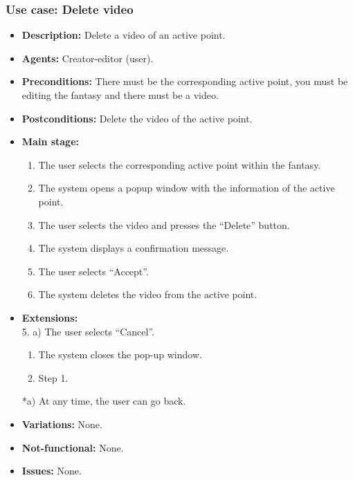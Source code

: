 \subsubsection{Use case: Delete video}
\begin{itemize}
	\item \textbf{Description:} Delete a video of an active point.
	\item \textbf{Agents:} Creator-editor (user).
	\item \textbf{Preconditions:} There must be the corresponding active point, you must be editing the fantasy and there must be a video.
	\item \textbf{Postconditions:} Delete the video of the active point.
	\item \textbf{Main stage:}
	\begin{enumerate}
		\item The user selects the corresponding active point within the fantasy.
		\item The system opens a popup window with the information of the active point.
		\item The user selects the video and presses the ``Delete'' button.
		\item The system displays a confirmation message.
		\item The user selects ``Accept''.
		\item The system deletes the video from the active point.
	\end{enumerate}
	\item \textbf{Extensions:} \\ 5. a) The user selects ``Cancel''.
	\begin{enumerate}
		\item The system closes the pop-up window.
		\item Step 1.
	\end{enumerate}
	*a) At any time, the user can go back.
	\item \textbf{Variations:} None.
	\item \textbf{Not-functional:} None.
	\item \textbf{Issues:} None.
\end{itemize}

